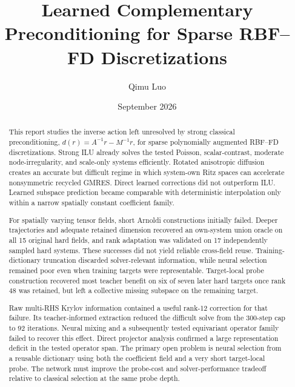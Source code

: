 \documentclass[11pt]{article}
\title{Learned Complementary Preconditioning for Sparse RBF--FD Discretizations}
\author{Qimu Luo}
\date{September 2026}
\begin{document}
\maketitle

\begingroup
\let\quotation\quote
\let\endquotation\endquote
\begin{abstract}
This report studies the inverse action left unresolved by strong classical preconditioning, $d(r)=A^{-1}r-M^{-1}r$, for sparse polynomially augmented RBF--FD discretizations. Strong ILU already solves the tested Poisson, scalar-contrast, moderate node-irregularity, and scale-only systems efficiently. Rotated anisotropic diffusion creates an accurate but difficult regime in which system-own Ritz spaces can accelerate nonsymmetric recycled GMRES. Direct learned corrections did not outperform ILU. Learned subspace prediction became comparable with deterministic interpolation only within a narrow spatially constant coefficient family.

For spatially varying tensor fields, short Arnoldi constructions initially failed. Deeper trajectories and adequate retained dimension recovered an own-system union oracle on all 15 original hard fields, and rank adaptation was validated on 17 independently sampled hard systems. These successes did not yield reliable cross-field reuse. Training-dictionary truncation discarded solver-relevant information, while neural selection remained poor even when training targets were representable. Target-local probe construction recovered most teacher benefit on six of seven later hard targets once rank 48 was retained, but left a collective missing subspace on the remaining target.

Raw multi-RHS Krylov information contained a useful rank-12 correction for that failure. Its teacher-informed extraction reduced the difficult solve from the 300-step cap to 92 iterations. Neural mixing and a subsequently tested equivariant operator family failed to recover this effect. Direct projector analysis confirmed a large representation deficit in the tested operator span. The primary open problem is neural selection from a reusable dictionary using both the coefficient field and a very short target-local probe. The network must improve the probe-cost and solver-performance tradeoff relative to classical selection at the same probe depth.
\end{abstract}
\endgroup







\end{document}
